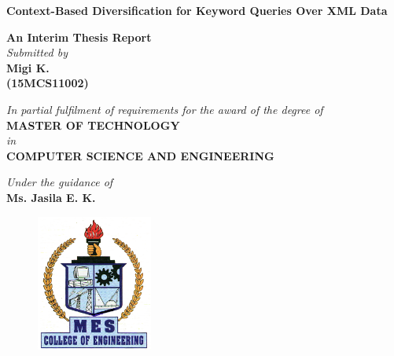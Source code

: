 \begin{titlepage}
\thispagestyle{empty}
         
		\begin{center}
        \vspace*{.2cm}
		   \textbf{\Large {Context-Based Diversification
for Keyword Queries Over XML Data}}
		\end{center}

		\vspace*{0.5cm}

		\begin{center}
				\textbf{An Interim Thesis Report}\\
		      	\emph{Submitted by}\\
		 \vspace{0.5cm}
				\textbf{Migi K.}\\
                 \textbf{(15MCS11002)}%
		\end{center}

    \vspace{0.5cm}

		\begin{center}
					\emph{In partial fulfilment of requirements for the award of the degree of}\\
				\vspace{0.2cm}
		      		\textbf{MASTER OF TECHNOLOGY}\\
				 \vspace{0.15cm}
		       	    \emph{in}\\
				\vspace{0.2cm}
	  				\textbf{COMPUTER SCIENCE AND ENGINEERING}\\
		\end{center}

	\vspace{0.2cm}
			\begin{center}
					\textit{Under the guidance of}\\
					\textbf{Ms. Jasila E. K.}
		\end{center}

		\vspace{0.1cm}
\begin{figure}[h]
            \centering
            \includegraphics[width=1.5in]{Logo.png}\\
\end{figure}


\end{titlepage}
